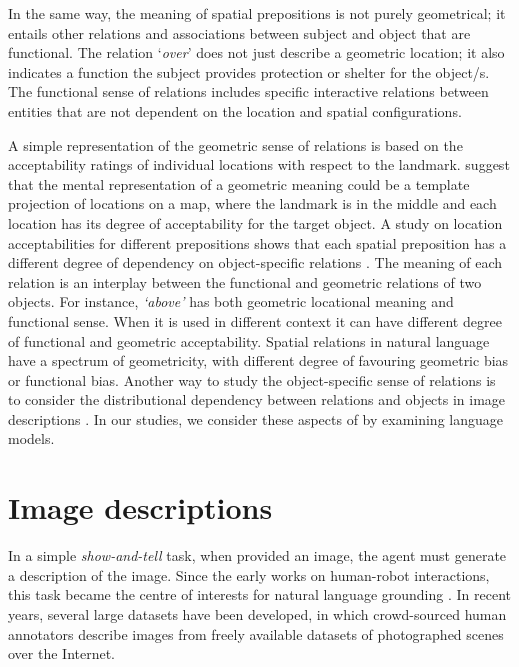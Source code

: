 In the same way, the meaning of spatial prepositions is not purely geometrical; it entails other relations and associations between subject and object that are functional. 
The relation  `\emph{over}' does not just describe a geometric location; it also indicates a function \textemdash  the subject provides protection or shelter for the object/s.
The functional sense of relations includes specific interactive relations between entities that are not dependent on the location and spatial configurations.

A simple representation of the geometric sense of relations is based on the acceptability ratings of individual locations with respect to the landmark. 
\cite{logan1996computational} suggest that the mental representation of a geometric meaning could be a template projection of locations on a map, where the landmark is in the middle and each location has its degree of acceptability for the target object. 
A study on location acceptabilities for different prepositions shows that each spatial preposition has a different degree of dependency on object-specific relations  \citep{coventry2001interplay}.
The meaning of each relation is an interplay between the functional and geometric relations of two objects.
For instance, \emph{`above'} has both geometric locational meaning and functional sense. 
When it is used in different context it can have different degree of functional and geometric acceptability.
Spatial relations in natural language have a spectrum of geometricity, with different degree of favouring geometric bias or functional bias. 
Another way to study the object-specific sense of relations is to consider the distributional dependency between relations and objects in image descriptions \citep{Dobnik:2013aa,Dobnik:2014ab}.
In our studies, we consider these aspects of by examining language models.

\section{Image descriptions}
\label{sec:spatial:image}
In a simple \emph{show-and-tell} task, when provided an image, the agent must generate a description of the image. 
Since the early works on human-robot interactions, this task became the centre of interests for natural language grounding \citep{roy2002learning}. 
In recent years, several large datasets have been developed, in which crowd-sourced human annotators describe images from freely available datasets of photographed scenes over the Internet.

